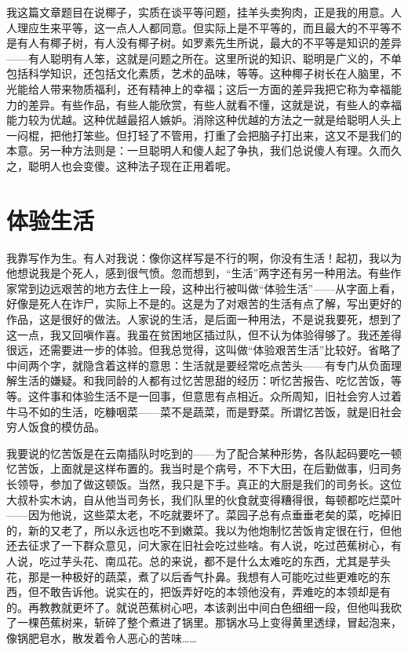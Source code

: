 我这篇文章题目在说椰子，实质在谈平等问题，挂羊头卖狗肉，正是我的用意。人人理应生来平等，这一点人人都同意。但实际上是不平等的，而且最大的不平等不是有人有椰子树，有人没有椰子树。如罗素先生所说，最大的不平等是知识的差异——有人聪明有人笨，这就是问题之所在。这里所说的知识、聪明是广义的，不单包括科学知识，还包括文化素质，艺术的品味，等等。这种椰子树长在人脑里，不光能给人带来物质福利，还有精神上的幸福；这后一方面的差异我把它称为幸福能力的差异。有些作品，有些人能欣赏，有些人就看不懂，这就是说，有些人的幸福能力较为优越。这种优越最招人嫉妒。消除这种优越的方法之一就是给聪明人头上一闷棍，把他打笨些。但打轻了不管用，打重了会把脑子打出来，这又不是我们的本意。另一种方法则是：一旦聪明人和傻人起了争执，我们总说傻人有理。久而久之，聪明人也会变傻。这种法子现在正用着呢。

\chapter{体验生活} 

我靠写作为生。有人对我说：像你这样写是不行的啊，你没有生活！起初，我以为他想说我是个死人，感到很气愤。忽而想到，“生活”两字还有另一种用法。有些作家常到边远艰苦的地方去住上一段，这种出行被叫做“体验生活”——从字面上看，好像是死人在诈尸，实际上不是的。这是为了对艰苦的生活有点了解，写出更好的作品，这是很好的做法。人家说的生活，是后面一种用法，不是说我要死，想到了这一点，我又回嗔作喜。我虽在贫困地区插过队，但不认为体验得够了。我还差得很远，还需要进一步的体验。但我总觉得，这叫做“体验艰苦生活”比较好。省略了中间两个字，就隐含着这样的意思：生活就是要经常吃点苦头——有专门从负面理解生活的嫌疑。和我同龄的人都有过忆苦思甜的经历：听忆苦报告、吃忆苦饭，等等。这件事和体验生活不是一回事，但意思有点相近。众所周知，旧社会穷人过着牛马不如的生活，吃糠咽菜——菜不是蔬菜，而是野菜。所谓忆苦饭，就是旧社会穷人饭食的模仿品。　 

我要说的忆苦饭是在云南插队时吃到的——为了配合某种形势，各队起码要吃一顿忆苦饭，上面就是这样布置的。我当时是个病号，不下大田，在后勤做事，归司务长领导，参加了做这顿饭。当然，我只是下手。真正的大厨是我们的司务长。这位大叔朴实木讷，自从他当司务长，我们队里的伙食就变得糟得很，每顿都吃烂菜叶——因为他说，这些菜太老，不吃就要坏了。菜园子总有点垂垂老矣的菜，吃掉旧的，新的又老了，所以永远也吃不到嫩菜。我以为他炮制忆苦饭肯定很在行，但他还去征求了一下群众意见，问大家在旧社会吃过些啥。有人说，吃过芭蕉树心，有人说，吃过芋头花、南瓜花。总的来说，都不是什么太难吃的东西，尤其是芋头花，那是一种极好的蔬菜，煮了以后香气扑鼻。我想有人可能吃过些更难吃的东西，但不敢告诉他。说实在的，把饭弄好吃的本领他没有，弄难吃的本领却是有的。再教教就更坏了。就说芭蕉树心吧，本该剥出中间白色细细一段，但他叫我砍了一棵芭蕉树来，斩碎了整个煮进了锅里。那锅水马上变得黄里透绿，冒起泡来，像锅肥皂水，散发着令人恶心的苦味……　 

